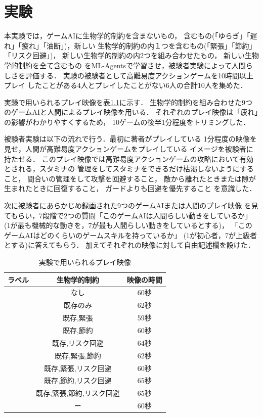 \documentclass[a4paper,12pt,oneside,openany,titlepage]{jreport}
\begin{document}
\chapter{実験}
 \thispagestyle{fancy}
 \lhead{\leftmark}
 \rhead{\thepage}
 \renewcommand{\headrulewidth}{1pt}

 本実験では，ゲームAIに生物学的制約を含まないもの，
 含むもの(「ゆらぎ」「遅れ」「疲れ」「油断」)，新しい
 生物学的制約の内１つを含むもの(「緊張」「節約」「リスク回避」)，
 新しい生物学的制約の内2つを組み合わせたもの，
 新しい生物学的制約を全て含むもの
 をML-Agentsで学習させ，被験者実験によって人間らしさを評価する．
 実験の被験者として高難易度アクションゲームを10時間以上プレイ
 したことがある4人とプレイしたことがない6人の合計10人を集めた．
 
 
 実験で用いられるプレイ映像を表\ref{eizo}に示す．
 生物学的制約を組み合わせた9つのゲームAIと人間によるプレイ映像を用いる．
 それぞれのプレイ映像は「疲れ」の影響がわかりやすくするため，
 10ゲームの後半1分程度をトリミングした．
 
 被験者実験は以下の流れで行う．最初に著者がプレイしている
 1分程度の映像を見せ，人間が高難易度アクションゲームをプレイしている
 イメージを被験者に持たせる．
 このプレイ映像では高難易度アクションゲームの攻略において有効とされる，スタミナの
 管理をしてスタミナをできるだけ枯渇しないようにすること，
 間合いの管理をして攻撃を回避すること，
 敵から離れたときまたは隙が生まれたときに回復すること，
 ガードよりも回避を優先すること
 を意識した．
 
 次に被験者にあらかじめ録画された9つのゲームAIまたは人間のプレイ映像
 を見てもらい，7段階で2つの質問「このゲームAIは人間らしい動きをしているか」
 (1が最も機械的な動きを，7が最も人間らしい動きをしているとする)，
 「このゲームAIはどのくらいのゲームスキルを持っているか」
 (1が初心者，7が上級者とする)に答えてもらう．
 加えてそれぞれの映像に対して自由記述欄を設けた．
 
 \begin{table}[!ht]
   \centering
   \caption{実験で用いられるプレイ映像}
   \label{eizo}
   \begin{tabular}{c|c|c}    
   \hline
       ラベル & 生物学的制約 & 映像の時間 \\ \hline
       [None] &  なし & 60秒 \\ \hline
       [Exist] & 既存のみ & 62秒 \\ \hline
       [Exist,Ner] & 既存,緊張 & 59秒 \\ \hline
       [Exist,Save] & 既存,節約 & 60秒 \\ \hline
       [Exist,Risk] & 既存,リスク回避 & 64秒 \\ \hline
       [Exist,Ner,Save] & 既存,緊張,節約 & 62秒 \\ \hline
       [Exist,Ner,Risk] & 既存,緊張,リスク回避 & 60秒 \\ \hline
       [Exist,Save,Risk] & 既存,節約,リスク回避 & 65秒 \\ \hline
       [Exist,Ner,Save,Risk] & 既存,緊張,節約,リスク回避 & 65秒 \\ \hline
       [Player] & ー & 60秒 \\ \hline
   \end{tabular}
 \end{table}
 
\end{document}
